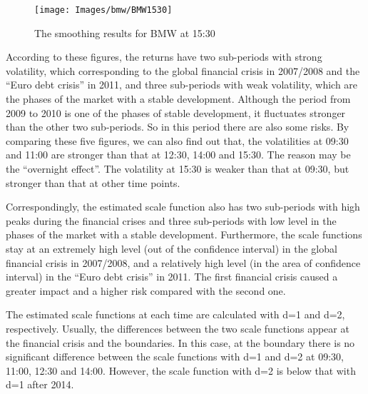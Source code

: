 \begin{figure}[!htbp]
	\centering
	\texttt{[image: Images/bmw/BMW1530]}
	\caption[The smoothing results for BMW at 15:30]{The smoothing results for BMW at 15:30}
	\label{fig:BMW1530}
\end{figure}


According to these figures, the returns have two sub-periods with strong volatility, which corresponding to the global financial crisis in 2007/2008 and the ``Euro debt crisis'' in 2011, and three sub-periods with weak volatility, which are the phases of the market with a stable development. Although the period from 2009 to 2010 is one of the phases of stable development, it fluctuates stronger than the other two sub-periods. So in this period there are also some risks. By comparing these five figures, we can also find out that, the volatilities at 09:30 and 11:00 are stronger than that at 12:30, 14:00 and 15:30. The reason may be the ``overnight effect''. The volatility at 15:30 is weaker than that at 09:30, but stronger than that at other time points.

Correspondingly, the estimated scale function also has two sub-periods with high peaks during the financial crises and three sub-periods with low level in the phases of the market with a stable development. Furthermore, the scale functions stay at an extremely high level (out of the confidence interval) in the global financial crisis in 2007/2008, and a relatively high level (in the area of confidence interval) in the ``Euro debt crisis'' in 2011. The first financial crisis caused a greater impact and a higher risk compared with the second one. 

The estimated scale functions at each time are calculated with d=1 and d=2, respectively. Usually, the differences between the two scale functions appear at the financial crisis and the boundaries. In this case, at the boundary there is no significant difference between the scale functions with d=1 and d=2 at 09:30, 11:00, 12:30 and 14:00. However, the scale function with d=2 is below that with d=1 after 2014. 

